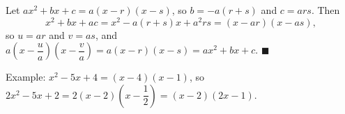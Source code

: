Let $ax^2+bx+c=a(x-r)(x-s)$, so $b=-a(r+s)$ and $c=ars$. Then
\[
x^2+bx+ac=x^2-a(r+s)x+a^2rs=(x-ar)(x-as),
\]
so $u=ar$ and $v=as$, and $a\left(x-\dfrac {u}{a}\right)\left(x-\dfrac {v}{a}\right)=a(x-r)(x-s)=ax^2+bx+c$. $\blacksquare$

Example: $x^2-5x+4=(x-4)(x-1)$, so $2x^2-5x+2=2(x-2)\left(x-\dfrac{1}{2}\right)=\boxed{(x-2)(2x-1)}$.
